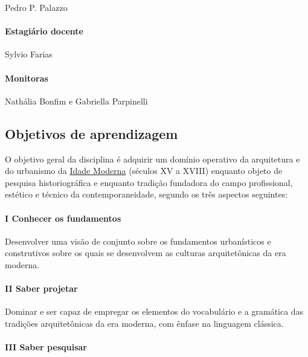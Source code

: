 \documentclass[
  11pt,
  brazil,
  a4paper,
]{article}
\begin{document}
Pedro P. Palazzo

\hypertarget{estagiuxe1rio-docente}{%
\paragraph{Estagiário docente}\label{estagiuxe1rio-docente}}

Sylvio Farias

\hypertarget{monitoras}{%
\paragraph{Monitoras}\label{monitoras}}

Nathália Bonfim e Gabriella Parpinelli

\hypertarget{objetivos-de-aprendizagem}{%
\subsection{Objetivos de aprendizagem}\label{objetivos-de-aprendizagem}}

O objetivo geral da disciplina é adquirir um domínio operativo da
arquitetura e do urbanismo da
\href{https://pt.wikipedia.org/wiki/Idade_Moderna}{Idade Moderna}
(séculos XV a XVIII) enquanto objeto de pesquisa historiográfica e
enquanto tradição fundadora do campo profissional, estético e técnico da
contemporaneidade, segundo os três aspectos seguintes:

\hypertarget{i-conhecer-os-fundamentos}{%
\paragraph{I Conhecer os fundamentos}\label{i-conhecer-os-fundamentos}}

Desenvolver uma visão de conjunto sobre os fundamentos urbanísticos e
construtivos sobre os quais se desenvolvem as culturas arquitetônicas da
era moderna.

\hypertarget{ii-saber-projetar}{%
\paragraph{II Saber projetar}\label{ii-saber-projetar}}

Dominar e ser capaz de empregar os elementos do vocabulário e a
gramática das tradições arquitetônicas da era moderna, com ênfase na
linguagem clássica.

\hypertarget{iii-saber-pesquisar}{%
\paragraph{III Saber pesquisar}\label{iii-saber-pesquisar}}
\end{document}
